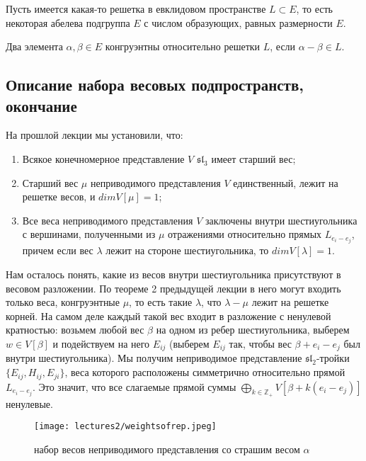 \documentclass[a4article]{article}
\begin{document}
Пусть имеется какая-то решетка в евклидовом пространстве $L \subset E$, то есть некоторая абелева подгруппа $E$ с числом образующих, равных размерности $E$.
\begin{definition}
    Два элемента $\alpha, \beta \in E$ конгруэнтны относительно решетки $L$, если $\alpha - \beta \in L$.
\end{definition}


\subsection*{Описание набора весовых подпространств, окончание}

На прошлой лекции мы установили, что:
\begin{enumerate}
    \item Всякое конечномерное представление $V$ $\mathfrak{sl}_3$ имеет старший вес;
    \item Старший вес $\mu$ неприводимого представления $V$ единственный, лежит на решетке весов, и $dim V[\mu]=1$;
    \item Все веса неприводимого представления $V$ заключены внутри шестиугольника с вершинами, полученными из $\mu$ отражениями относительно прямых $L_{e_i-e_j}$, причем если вес $\lambda$ лежит на стороне шестиугольника, то $dim V[\lambda]=1$.
\end{enumerate}

Нам осталось понять, какие из весов внутри шестиугольника присутствуют в весовом разложении. По теореме 2 предыдущей лекции в него могут входить только веса, конгруэнтные $\mu$, то есть такие $\lambda$, что $\lambda - \mu$ лежит на решетке корней. На самом деле каждый такой вес входит в разложение с ненулевой кратностью: возьмем любой вес $\beta$ на одном из ребер шестиугольника, выберем $w \in V[\beta]$ и подействуем на него $E_{ij}$ (выберем $E_{ij}$ так, чтобы вес $\beta + e_i - e_j$ был внутри шестиугольника). Мы получим неприводимое представление $\mathfrak{sl}_2$-тройки $\{E_{ij}, H_{ij}, E_{ji}\}$, веса которого расположены симметрично относительно прямой $L_{e_i-e_j}$. Это значит, что все слагаемые прямой суммы $\bigoplus_{k \in \mathbb{Z}_+}V[\beta + k(e_i-e_j)]$ ненулевые.

\begin{figure}[h!]
\centering
\texttt{[image: lectures2/weightsofrep.jpeg]}
\caption{набор весов неприводимого представления со страшим весом $\alpha$}
\label{fig:enter-label}
\end{figure}
\end{document}
